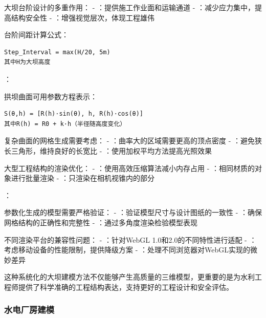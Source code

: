 
大坝台阶设计的多重作用： - ：提供施工作业面和运输通道 - ：减少应力集中，提高结构安全性 - ：增强视觉层次，体现工程雄伟

台阶间距计算公式：

\begin{lstlisting}
Step_Interval = max(H/20, 5m)
其中H为大坝高度
\end{lstlisting}

：


拱坝曲面可用参数方程表示：

\begin{lstlisting}
S(θ,h) = [R(h)·sin(θ), h, R(h)·cos(θ)]
其中R(h) = R0 + k·h（半径随高度变化）
\end{lstlisting}


复杂曲面的网格生成需要考虑： - ：曲率大的区域需要更高的顶点密度 - ：避免狭长三角形，维持良好的长宽比 - ：使用加权平均方法提高光照效果


大型工程结构的渲染优化： - ：使用高效压缩算法减小内存占用 - ：相同材质的对象进行批量渲染 - ：只渲染在相机视锥内的部分

：


参数化生成的模型需要严格验证： - ：验证模型尺寸与设计图纸的一致性 - ：确保网格结构的正确性和完整性 - ：通过多角度渲染检验模型表现


不同渲染平台的兼容性问题： - ：针对WebGL 1.0和2.0的不同特性进行适配 - ：考虑移动设备的性能限制，提供降级方案 - ：处理不同浏览器对WebGL实现的微妙差异

这种系统化的大坝建模方法不仅能够产生高质量的三维模型，更重要的是为水利工程师提供了科学准确的工程结构表达，支持更好的工程设计和安全评估。

\hypertarget{ux6c34ux7535ux5382ux623fux5efaux6a21}{%
\subsubsection{水电厂房建模}\label{ux6c34ux7535ux5382ux623fux5efaux6a21}}

